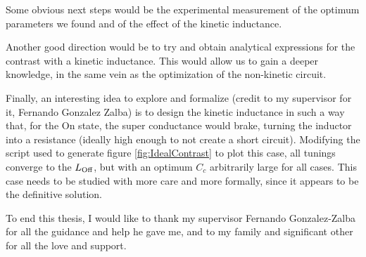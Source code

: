 \documentclass[../main.tex]{subfiles}
\begin{document}
Some obvious next steps would be the experimental measurement of
the optimum parameters we found and of the effect of the kinetic inductance.

Another good direction would be to try and obtain analytical expressions for
the contrast with a kinetic inductance. This would allow us to gain a deeper
knowledge, in the same vein as the optimization of the non-kinetic circuit.

Finally, an interesting idea to explore and formalize (credit to my supervisor for it,
Fernando Gonzalez Zalba) is to design the kinetic inductance in such a way that,
for the On state, the super conductance would brake, turning the inductor into a
resistance (ideally high enough to not create a short circuit).
Modifying the script used to generate figure \ref{fig:IdealContrast}
to plot this case, all tunings converge to the \(L_{\text{Off}}\), but with an
optimum \(C_{c}\) arbitrarily large for all cases. This case needs to be
studied with more care and more formally, since it appears to be the definitive
solution.

To end this thesis, I would like to thank my supervisor Fernando Gonzalez-Zalba
for all the guidance and help he gave me, and to my family and significant
other for all the love and support.
\end{document}
